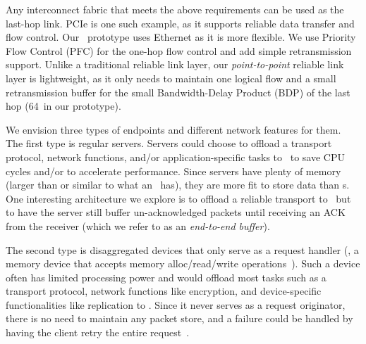 Any interconnect fabric that meets the above requirements can be used as the last-hop link.
PCIe is one such example, as it supports reliable data transfer and flow control.
Our \snic\ prototype uses Ethernet as it is more flexible.
We use Priority Flow Control (PFC) for the one-hop flow control and add simple retransmission support.
Unlike a traditional reliable link layer, our {\em point-to-point} reliable link layer is lightweight, %
as it only needs to maintain one logical flow and a small retransmission buffer for the small Bandwidth-Delay Product (BDP) of the last hop (64\KB\ in our prototype).

We envision three types of endpoints and different network features for them.
The first type is regular servers.
Servers could choose to offload a transport protocol, network functions, and/or application-specific tasks to \snic\ to save CPU cycles and/or to accelerate performance.
Since servers have plenty of memory (larger than or similar to what an \snic\ has), they are more fit to store data than \snic{}s.
One interesting architecture we explore is to offload a reliable transport to \snic\ but to have the server still buffer un-acknowledged packets until receiving an ACK from the receiver (which we refer to as an {\em end-to-end buffer}).

The second type is disaggregated devices that only serve as a request handler (\eg, a memory device that accepts memory alloc/read/write operations~\cite{clio-arxiv,ATC20-pDPM}). 
Such a device often has limited processing power and would offload most tasks such as a transport protocol, network functions like encryption, and device-specific functionalities like replication to \snic. 
Since it never serves as a request originator, there is no need to maintain any packet store, and a failure could be handled by having the client retry the entire request~\cite{clio-arxiv,homa-sigcomm18,1RMA-sigcomm20}.

